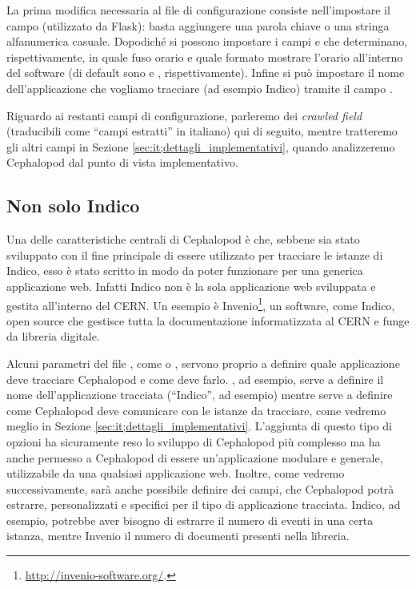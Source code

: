             La prima modifica necessaria al file di configurazione consiste nell'impostare il campo  (utilizzato da Flask): basta aggiungere una parola chiave o una stringa alfanumerica casuale. Dopodiché si possono impostare i campi  e  che determinano, rispettivamente, in quale fuso orario e quale formato mostrare l'orario all'interno del software (di default sono  e , rispettivamente). Infine si può impostare il nome dell'applicazione che vogliamo tracciare (ad esempio Indico) tramite il campo .
            
            Riguardo ai restanti campi di configurazione, parleremo dei \textit{crawled field} (traducibili come ``campi estratti'' in italiano) qui di seguito, mentre tratteremo gli altri campi in Sezione \ref{sec:it;dettagli_implementativi}, quando analizzeremo Cephalopod dal punto di vista implementativo.
            
        \subsection{Non solo Indico} \label{sec:it;cp;non_solo_indico}
        
            Una delle caratteristiche centrali di Cephalopod è che, sebbene sia stato sviluppato con il fine principale di essere utilizzato per tracciare le istanze di Indico, esso è stato scritto in modo da poter funzionare per una generica applicazione web. Infatti Indico non è la sola applicazione web sviluppata e gestita all'interno del \ac{CERN}. Un esempio è Invenio\footnote{\url{http://invenio-software.org/}.}, un software, come Indico, open source che gestisce tutta la documentazione informatizzata al \ac{CERN} e funge da libreria digitale.
            
            Alcuni parametri del file , come  o , servono proprio a definire quale applicazione deve tracciare Cephalopod e come deve farlo. , ad esempio, serve a definire il nome dell'applicazione tracciata (``Indico'', ad esempio) mentre  serve a definire come Cephalopod deve comunicare con le istanze da tracciare, come vedremo meglio in Sezione \ref{sec:it;dettagli_implementativi}. L'aggiunta di questo tipo di opzioni ha sicuramente reso lo sviluppo di Cephalopod più complesso ma ha anche permesso a Cephalopod di essere un'applicazione modulare e generale, utilizzabile da una qualsiasi applicazione web. Inoltre, come vedremo successivamente, sarà anche possibile definire dei campi, che Cephalopod potrà estrarre, personalizzati e specifici per il tipo di applicazione tracciata. Indico, ad esempio, potrebbe aver bisogno di estrarre il numero di eventi in una certa istanza, mentre Invenio il numero di documenti presenti nella libreria.
            
